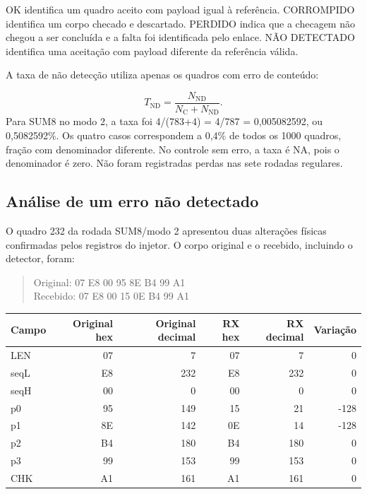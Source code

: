 \documentclass[12pt,a4paper]{article}
\begin{document}
OK identifica um quadro aceito com payload igual à referência. CORROMPIDO identifica um corpo checado e descartado. PERDIDO indica que a checagem não chegou a ser concluída e a falta foi identificada pelo enlace. NÃO DETECTADO identifica uma aceitação com payload diferente da referência válida.

A taxa de não detecção utiliza apenas os quadros com erro de conteúdo:

\begin{equation}T_{\mathrm{ND}}=\frac{N_{\mathrm{ND}}}{N_{\mathrm{C}}+N_{\mathrm{ND}}}.\end{equation}
Para SUM8 no modo 2, a taxa foi 4/(783+4) = 4/787 = 0,005082592, ou 0,5082592\%. Os quatro casos correspondem a 0,4\% de todos os 1000 quadros, fração com denominador diferente. No controle sem erro, a taxa é NA, pois o denominador é zero. Não foram registradas perdas nas sete rodadas regulares.

\FloatBarrier
\clearpage
\subsection{Análise de um erro não detectado}
O quadro 232 da rodada SUM8/modo 2 apresentou duas alterações físicas confirmadas pelos registros do injetor. O corpo original e o recebido, incluindo o detector, foram:

\begin{quote}\small\ttfamily\raggedright Original: 07 E8 00 95 8E B4 99 A1\\
Recebido: 07 E8 00 15 0E B4 99 A1\end{quote}

\par\smallskip\noindent\begin{minipage}{\textwidth}\centering\small
{}
\begin{tabularx}{\textwidth}{@{}Y r r r r r@{}}\toprule
\textbf{Campo} & \textbf{Original hex} & \textbf{Original decimal} & \textbf{RX hex} & \textbf{RX decimal} & \textbf{Variação}\\\midrule
LEN & 07 & 7 & 07 & 7 & 0\\
seqL & E8 & 232 & E8 & 232 & 0\\
seqH & 00 & 0 & 00 & 0 & 0\\
p0 & 95 & 149 & 15 & 21 & -128\\
p1 & 8E & 142 & 0E & 14 & -128\\
p2 & B4 & 180 & B4 & 180 & 0\\
p3 & 99 & 153 & 99 & 153 & 0\\
CHK & A1 & 161 & A1 & 161 & 0\\
\bottomrule\end{tabularx}
\par{}\end{minipage}\par\smallskip
\end{document}
